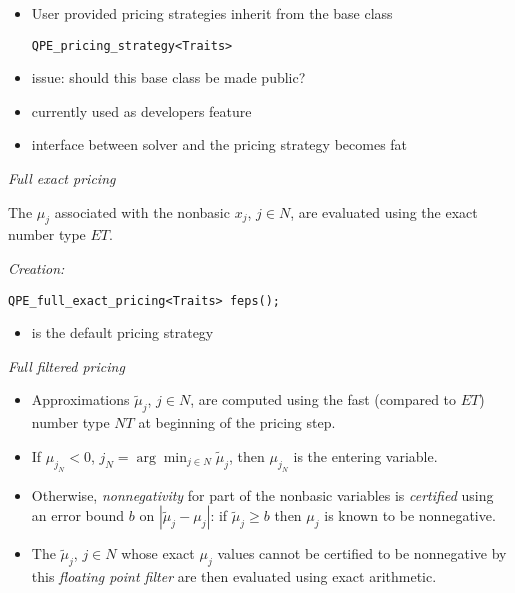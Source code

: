 \documentclass{slides}
\begin{document}
\begin{note}
\begin{itemize}
\item User provided pricing strategies inherit from the base class
\begin{verbatim}
QPE_pricing_strategy<Traits>
\end{verbatim}

\item issue: should this base class be made public?
\item currently used as developers feature
\item interface between solver and the pricing strategy becomes fat
\end{itemize}
\end{note}


\begin{slide}
\emph{Full exact pricing}

The $\mu_{j}$ associated with the nonbasic $x_{j}$, $j \in N$, are
evaluated using the exact number type $ET$.

\emph{Creation:}
\begin{verbatim}
QPE_full_exact_pricing<Traits> feps();
\end{verbatim}
\end{slide}

\begin{note}
\begin{itemize}
\item is the default pricing strategy
\end{itemize}
\end{note}

\begin{slide}
\emph{Full filtered pricing}

\begin{itemize}
\item Approximations $\tilde{\mu}_{j}$, $j \in N$, are computed using the fast
(compared to $ET$) number type $NT$ at beginning of the pricing step.

\item If $\mu_{j_{N}} < 0$, $j_{N}=\arg\min_{j \in N}\tilde{\mu}_{j}$, then 
$\mu_{j_{N}}$ is the entering variable.

\item Otherwise, \emph{nonnegativity} for part of the nonbasic variables is
\emph{certified} using an error bound $b$ on
$\left|\tilde{\mu}_{j}-\mu_{j}\right|$: if $\tilde{\mu}_{j} \geq b$ then
$\mu_{j}$ is known to be nonnegative.

\item The $\tilde{\mu}_{j}$, $j \in N$ whose exact $\mu_{j}$ values cannot be
certified to be nonnegative by this \emph{floating point filter} are then
evaluated using exact arithmetic. 
\end{itemize}
\end{slide}
\end{document}
